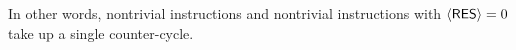 \begin{enumerate}[resume]
\end{enumerate}
In other words, nontrivial  instructions and nontrivial  instructions with $\langle{}\textsf{RES}\rangle{} = 0$ take up a single counter-cycle.

